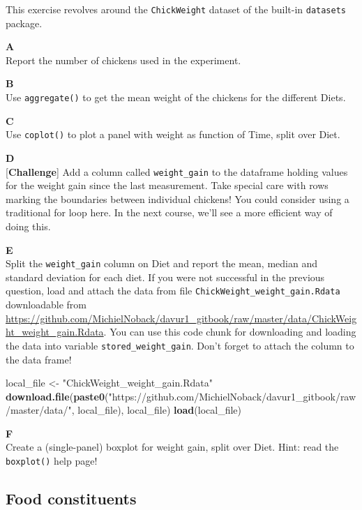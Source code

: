 \documentclass[]{book}
\newenvironment{Shaded}{\begin{snugshade}}{\end{snugshade}}
\newcommand{\KeywordTok}[1]{\textcolor[rgb]{0.13,0.29,0.53}{\textbf{#1}}}
\newcommand{\NormalTok}[1]{#1}
\newcommand{\StringTok}[1]{\textcolor[rgb]{0.31,0.60,0.02}{#1}}
\begin{document}
This exercise revolves around the \texttt{ChickWeight} dataset of the built-in \texttt{datasets} package.

\textbf{A}\\
Report the number of chickens used in the experiment.

\textbf{B}\\
Use \texttt{aggregate()} to get the mean weight of the chickens for the different Diets.

\textbf{C}\\
Use \texttt{coplot()} to plot a panel with weight as function of Time, split over Diet.

\textbf{D}\\
{[}\textbf{Challenge}{]} Add a column called \texttt{weight\_gain} to the dataframe holding values for the weight gain since the last measurement. Take special care with rows marking the boundaries between individual chickens! You could consider using a traditional for loop here.
In the next course, we'll see a more efficient way of doing this.

\textbf{E}\\
Split the \texttt{weight\_gain} column on Diet and report the mean, median and standard deviation for each diet.
If you were not successful in the previous question, load and attach the data from file \texttt{ChickWeight\_weight\_gain.Rdata} downloadable from \url{https://github.com/MichielNoback/davur1_gitbook/raw/master/data/ChickWeight_weight_gain.Rdata}. You can use this code chunk for downloading and loading the data into variable \texttt{stored\_weight\_gain}. Don't forget to attach the column to the data frame!

\begin{Shaded}
\begin{Highlighting}[]
\NormalTok{local_file <-}\StringTok{ "ChickWeight_weight_gain.Rdata"}
\KeywordTok{download.file}\NormalTok{(}\KeywordTok{paste0}\NormalTok{(}\StringTok{"https://github.com/MichielNoback/davur1_gitbook/raw/master/data/"}\NormalTok{, local_file), local_file)}
\KeywordTok{load}\NormalTok{(local_file)}
\end{Highlighting}
\end{Shaded}

\textbf{F}\\
Create a (single-panel) boxplot for weight gain, split over Diet. Hint: read the \texttt{boxplot()} help page!

\hypertarget{food-constituents}{%
\subsection{Food constituents}\label{food-constituents}}
\end{document}
